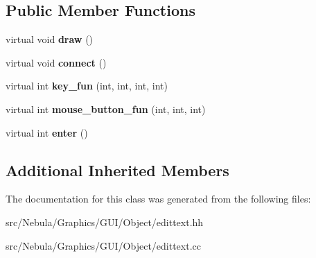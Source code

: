 \subsection*{Public Member Functions}
\begin{DoxyCompactItemize}
\item 
\hypertarget{classNeb_1_1gui_1_1object_1_1edittext_aa6211b16aae04ed3a75e7f3cf57448ac}{virtual void {\bfseries draw} ()}\label{classNeb_1_1gui_1_1object_1_1edittext_aa6211b16aae04ed3a75e7f3cf57448ac}

\item 
\hypertarget{classNeb_1_1gui_1_1object_1_1edittext_abfd525f65e61084f655d0815f4926dbb}{virtual void {\bfseries connect} ()}\label{classNeb_1_1gui_1_1object_1_1edittext_abfd525f65e61084f655d0815f4926dbb}

\item 
\hypertarget{classNeb_1_1gui_1_1object_1_1edittext_aaf964c13d292d5235b0180a78dc7e7cb}{virtual int {\bfseries key\-\_\-fun} (int, int, int, int)}\label{classNeb_1_1gui_1_1object_1_1edittext_aaf964c13d292d5235b0180a78dc7e7cb}

\item 
\hypertarget{classNeb_1_1gui_1_1object_1_1edittext_a9e358f09b75c1c7e554498144cac4f94}{virtual int {\bfseries mouse\-\_\-button\-\_\-fun} (int, int, int)}\label{classNeb_1_1gui_1_1object_1_1edittext_a9e358f09b75c1c7e554498144cac4f94}

\item 
\hypertarget{classNeb_1_1gui_1_1object_1_1edittext_ace2b347d504a9f315d286f958ccc4038}{virtual int {\bfseries enter} ()}\label{classNeb_1_1gui_1_1object_1_1edittext_ace2b347d504a9f315d286f958ccc4038}

\end{DoxyCompactItemize}
\subsection*{Additional Inherited Members}


The documentation for this class was generated from the following files\-:\begin{DoxyCompactItemize}
\item 
src/\-Nebula/\-Graphics/\-G\-U\-I/\-Object/edittext.\-hh\item 
src/\-Nebula/\-Graphics/\-G\-U\-I/\-Object/edittext.\-cc\end{DoxyCompactItemize}
